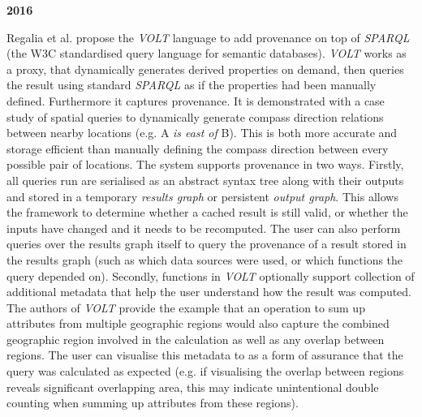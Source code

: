 \textbf{2016}

Regalia et al. \cite{Regalia2016} propose the \textit{VOLT} language to add provenance on top of \textit{SPARQL} (the W3C standardised query language for semantic databases). \textit{VOLT} works as a proxy, that dynamically generates derived properties on demand, then queries the result using standard \textit{SPARQL} as if the properties had been manually defined. Furthermore it captures provenance. It is demonstrated with a case study of spatial queries to dynamically generate compass direction relations between nearby locations (e.g. A \textit{is east of} B). This is both more accurate and storage efficient than manually defining the compass direction between every possible pair of locations. The system supports provenance in two ways. Firstly, all queries run are serialised as an abstract syntax tree along with their outputs and stored in a temporary \textit{results graph} or persistent \textit{output graph}. This allows the framework to determine whether a cached result is still valid, or whether the inputs have changed and it needs to be recomputed. The user can also perform queries over the results graph itself to query the provenance of a result stored in the results graph (such as which data sources were used, or which functions the query depended on). Secondly, functions in \textit{VOLT} optionally support collection of additional metadata that help the user understand how the result was computed. The authors of \textit{VOLT} provide the example that an operation to sum up attributes from multiple geographic regions would also capture the combined geographic region involved in the calculation as well as any overlap between regions. The user can visualise this metadata to as a form of assurance that the query was calculated as expected (e.g. if visualising the overlap between regions reveals significant overlapping area, this may indicate unintentional double counting when summing up attributes from these regions).



